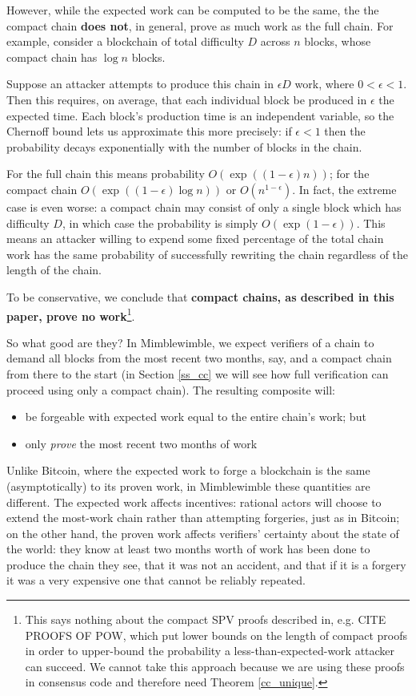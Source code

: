 \documentclass[letterpaper]{article}
\begin{document}
However, while the expected work can be computed to be the same, the
the compact chain \textbf{does not}, in general, prove as much work as
the full chain. For example, consider a blockchain of total difficulty
$D$ across $n$ blocks, whose compact chain has $\log n$ blocks.

Suppose an attacker attempts to produce this chain in $\epsilon D$ work,
where $0<\epsilon<1$. Then this requires, on average, that each individual
block be produced in $\epsilon$ the expected time. Each block's production
time is an independent variable, so the Chernoff bound lets us approximate
this more precisely: if $\epsilon < 1$ then the probability decays
exponentially with the number of blocks in the chain.

For the full chain this means probability $O(\exp((1 - \epsilon)n))$; for
the compact chain $O(\exp((1 - \epsilon)\log n))$ or $O(n^{1-\epsilon})$.
In fact, the extreme case is even worse: a compact chain may consist of
only a single block which has difficulty $D$, in which case the probability
is simply $O(\exp(1 - \epsilon))$. This means an attacker willing to expend
some fixed percentage of the total chain work has the same probability of
successfully rewriting the chain regardless of the length of the chain.

To be conservative, we conclude that \textbf{compact chains, as described
in this paper, prove no work}\footnote{This says nothing about the compact
SPV proofs described in, e.g. CITE PROOFS OF POW, which put lower bounds
on the length of compact proofs in order to upper-bound the probability
a less-than-expected-work attacker can succeed. We cannot take this approach
because we are using these proofs in consensus code and therefore need
Theorem \ref{cc_unique}.}.

So what good are they? In Mimblewimble, we expect verifiers of a chain to
demand all blocks from the most recent two months, say, and a compact chain
from there to the start (in Section \ref{ss_cc} we will see how full verification
can proceed using only a compact chain). The resulting composite will:
\begin{itemize}
\item be forgeable with expected work equal to the entire chain's work; but
\item only \emph{prove} the most recent two months of work
\end{itemize}
Unlike Bitcoin, where the expected work to forge a blockchain is the same
(asymptotically) to its proven work, in Mimblewimble these quantities are
different. The expected work affects incentives: rational actors will choose
to extend the most-work chain rather than attempting forgeries, just as in
Bitcoin; on the other hand, the proven work affects verifiers' certainty
about the state of the world: they know at least two months worth of work
has been done to produce the chain they see, that it was not an accident,
and that if it is a forgery it was a very expensive one that cannot be
reliably repeated.
\end{document}
